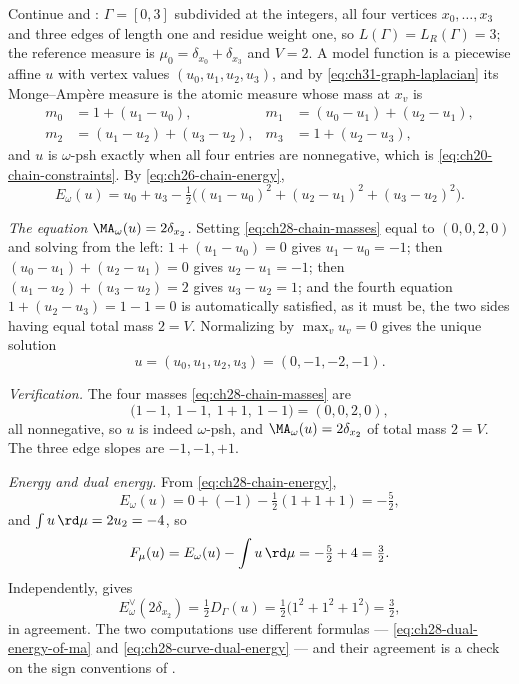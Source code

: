 \begin{example}[{The chain \(\Gamma=[0,3]\): a solved equation, verified}]
\label{ex:ch28-chain-dual-energy}
Continue  and :
\(\Gamma=[0,3]\) subdivided at the integers, all four vertices
\(x_0,\ldots,x_3\) and three edges of length one and residue weight
one, so \(L(\Gamma)=L_R(\Gamma)=3\); the
reference measure is \(\mu_0=\delta_{x_0}+\delta_{x_3}\) and \(V=2\).  A
model function is a piecewise affine \(u\) with vertex values
\((u_0,u_1,u_2,u_3)\), and by \eqref{eq:ch31-graph-laplacian} its
Monge--Amp\`ere measure is the atomic measure whose mass at \(x_v\) is
\begin{equation}
\label{eq:ch28-chain-masses}
 \begin{aligned}
 m_0&=1+(u_1-u_0),
 &m_1&=(u_0-u_1)+(u_2-u_1),\\
 m_2&=(u_1-u_2)+(u_3-u_2),
 &m_3&=1+(u_2-u_3),
 \end{aligned}
\end{equation}
and \(u\) is \(\omega\)-psh exactly when all four entries are nonnegative,
which is \eqref{eq:ch20-chain-constraints}.  By
\eqref{eq:ch26-chain-energy},
\begin{equation}
\label{eq:ch28-chain-energy}
 E_\omega(u)=u_0+u_3
   -\tfrac12\bigl((u_1-u_0)^2+(u_2-u_1)^2+(u_3-u_2)^2\bigr).
\end{equation}

\emph{The equation \(\MA_\omega(u)=2\delta_{x_2}\).}  Setting
\eqref{eq:ch28-chain-masses} equal to \((0,0,2,0)\) and solving from the
left: \(1+(u_1-u_0)=0\) gives \(u_1-u_0=-1\); then
\((u_0-u_1)+(u_2-u_1)=0\) gives \(u_2-u_1=-1\); then
\((u_1-u_2)+(u_3-u_2)=2\) gives \(u_3-u_2=1\); and the fourth equation
\(1+(u_2-u_3)=1-1=0\) is automatically satisfied, as it must be, the two
sides having equal total mass \(2=V\).  Normalizing by
\(\max_vu_v=0\) gives the unique solution
\begin{equation}
\label{eq:ch28-chain-solution}
 u=(u_0,u_1,u_2,u_3)=(0,-1,-2,-1).
\end{equation}

\emph{Verification.}  The four masses \eqref{eq:ch28-chain-masses} are
\[
 \bigl(1-1,\ 1-1,\ 1+1,\ 1-1\bigr)=(0,0,2,0),
\]
all nonnegative, so \(u\) is indeed \(\omega\)-psh, and
\(\MA_\omega(u)=2\delta_{x_2}\) of total mass \(2=V\).  The three edge
slopes are \(-1,-1,+1\).

\emph{Energy and dual energy.}  From \eqref{eq:ch28-chain-energy},
\[
 E_\omega(u)=0+(-1)-\tfrac12(1+1+1)=-\tfrac52 ,
\]
and \(\int u\,\rd\mu=2u_2=-4\), so
\[
 F_\mu(u)=E_\omega(u)-\int u\,\rd\mu=-\tfrac52+4=\tfrac32 .
\]
Independently,  gives
\[
 E^\vee_\omega(2\delta_{x_2})=\tfrac12D_\Gamma(u)
 =\tfrac12\bigl(1^2+1^2+1^2\bigr)=\tfrac32 ,
\]
in agreement.  The two computations use different formulas ---
\eqref{eq:ch28-dual-energy-of-ma} and
\eqref{eq:ch28-curve-dual-energy} --- and their agreement is a check on the
sign conventions of .


\end{example}
